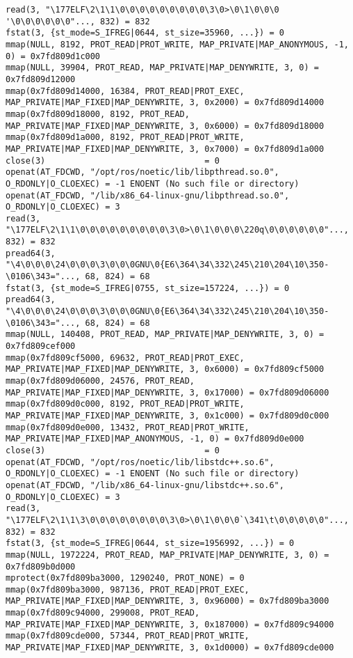 \documentclass[a4paper, 14pt]{article}
\begin{document}
\begin{lstlisting}
read(3, "\177ELF\2\1\1\0\0\0\0\0\0\0\0\0\3\0>\0\1\0\0\0 '\0\0\0\0\0\0"..., 832) = 832
fstat(3, {st_mode=S_IFREG|0644, st_size=35960, ...}) = 0
mmap(NULL, 8192, PROT_READ|PROT_WRITE, MAP_PRIVATE|MAP_ANONYMOUS, -1, 0) = 0x7fd809d1c000
mmap(NULL, 39904, PROT_READ, MAP_PRIVATE|MAP_DENYWRITE, 3, 0) = 0x7fd809d12000
mmap(0x7fd809d14000, 16384, PROT_READ|PROT_EXEC, MAP_PRIVATE|MAP_FIXED|MAP_DENYWRITE, 3, 0x2000) = 0x7fd809d14000
mmap(0x7fd809d18000, 8192, PROT_READ, MAP_PRIVATE|MAP_FIXED|MAP_DENYWRITE, 3, 0x6000) = 0x7fd809d18000
mmap(0x7fd809d1a000, 8192, PROT_READ|PROT_WRITE, MAP_PRIVATE|MAP_FIXED|MAP_DENYWRITE, 3, 0x7000) = 0x7fd809d1a000
close(3)                                = 0
openat(AT_FDCWD, "/opt/ros/noetic/lib/libpthread.so.0", O_RDONLY|O_CLOEXEC) = -1 ENOENT (No such file or directory)
openat(AT_FDCWD, "/lib/x86_64-linux-gnu/libpthread.so.0", O_RDONLY|O_CLOEXEC) = 3
read(3, "\177ELF\2\1\1\0\0\0\0\0\0\0\0\0\3\0>\0\1\0\0\0\220q\0\0\0\0\0\0"..., 832) = 832
pread64(3, "\4\0\0\0\24\0\0\0\3\0\0\0GNU\0{E6\364\34\332\245\210\204\10\350-\0106\343="..., 68, 824) = 68
fstat(3, {st_mode=S_IFREG|0755, st_size=157224, ...}) = 0
pread64(3, "\4\0\0\0\24\0\0\0\3\0\0\0GNU\0{E6\364\34\332\245\210\204\10\350-\0106\343="..., 68, 824) = 68
mmap(NULL, 140408, PROT_READ, MAP_PRIVATE|MAP_DENYWRITE, 3, 0) = 0x7fd809cef000
mmap(0x7fd809cf5000, 69632, PROT_READ|PROT_EXEC, MAP_PRIVATE|MAP_FIXED|MAP_DENYWRITE, 3, 0x6000) = 0x7fd809cf5000
mmap(0x7fd809d06000, 24576, PROT_READ, MAP_PRIVATE|MAP_FIXED|MAP_DENYWRITE, 3, 0x17000) = 0x7fd809d06000
mmap(0x7fd809d0c000, 8192, PROT_READ|PROT_WRITE, MAP_PRIVATE|MAP_FIXED|MAP_DENYWRITE, 3, 0x1c000) = 0x7fd809d0c000
mmap(0x7fd809d0e000, 13432, PROT_READ|PROT_WRITE, MAP_PRIVATE|MAP_FIXED|MAP_ANONYMOUS, -1, 0) = 0x7fd809d0e000
close(3)                                = 0
openat(AT_FDCWD, "/opt/ros/noetic/lib/libstdc++.so.6", O_RDONLY|O_CLOEXEC) = -1 ENOENT (No such file or directory)
openat(AT_FDCWD, "/lib/x86_64-linux-gnu/libstdc++.so.6", O_RDONLY|O_CLOEXEC) = 3
read(3, "\177ELF\2\1\1\3\0\0\0\0\0\0\0\0\3\0>\0\1\0\0\0`\341\t\0\0\0\0\0"..., 832) = 832
fstat(3, {st_mode=S_IFREG|0644, st_size=1956992, ...}) = 0
mmap(NULL, 1972224, PROT_READ, MAP_PRIVATE|MAP_DENYWRITE, 3, 0) = 0x7fd809b0d000
mprotect(0x7fd809ba3000, 1290240, PROT_NONE) = 0
mmap(0x7fd809ba3000, 987136, PROT_READ|PROT_EXEC, MAP_PRIVATE|MAP_FIXED|MAP_DENYWRITE, 3, 0x96000) = 0x7fd809ba3000
mmap(0x7fd809c94000, 299008, PROT_READ, MAP_PRIVATE|MAP_FIXED|MAP_DENYWRITE, 3, 0x187000) = 0x7fd809c94000
mmap(0x7fd809cde000, 57344, PROT_READ|PROT_WRITE, MAP_PRIVATE|MAP_FIXED|MAP_DENYWRITE, 3, 0x1d0000) = 0x7fd809cde000

\end{lstlisting}
\end{document}
